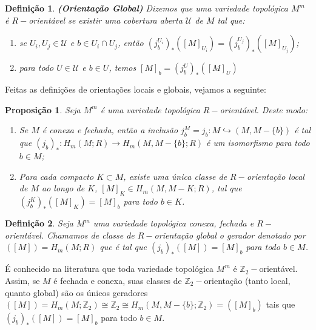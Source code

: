 \documentclass[12pt,oneside]{book} %
\newtheorem{defi}   {\hspace{0.5cm}Defini\c c\~ao}[chapter]
\newtheorem{prop}   {\hspace{0.5cm}Proposi\c c\~ao}[chapter]
\newcommand{\Z}{\mathbb{Z}}
\begin{document}
\begin{defi}{\bf (Orientação Global)}
	Dizemos que uma variedade topológica $M^{m}$ é $R-$orientável se existir uma cobertura aberta $\mathcal{U}$ de $M$ tal que:
	\begin{enumerate}
		\item se $U_{i},U_{j}\in\mathcal{U}$ e $b\in U_{i}\cap U_{j}$, então $(j_{b}^{U_{i}})_{*}([M]_{U_{i}})=(j_{b}^{U_{j}})_{*}([M]_{U_{j}})$;
		\item para todo $U\in\mathcal{U}$ e $b\in U$, temos $[M]_{b}=(j_{b}^{U})_{*}([M]_{U})$
	\end{enumerate}
\end{defi}

\par Feitas as definições de orientações locais e globais, vejamos a seguinte:

\begin{prop}\label{orient_local}
	Seja $M^{m}$ é uma variedade topológica $R-$orientável. Deste modo:
	\begin{enumerate}
		\item Se $M$ é conexa e fechada, então a inclusão $j_{b}^{M}=j_{b}:M\hookrightarrow (M,M-\{b\})$ é tal que $(j_{b})_{*}:H_{m}(M;R)\to H_{m}(M,M-\{b\};R)$ é um isomorfismo para todo $b\in M$;
		\item Para cada compacto $K\subset M$, existe uma única classe de $R-$orientação local de $M$ ao longo de $K$, $[M]_{K}\in H_{m}(M,M-K;R)$, tal que $(j_{b}^{K})_{*}([M]_{K})=[M]_{b}$ para todo $b\in K$.
	\end{enumerate}
\end{prop}

\begin{defi}
	Seja $M^{m}$ uma variedade topológica conexa, fechada e $R-$orientável. Chamamos de classe de $R-$orientação global o gerador denotado por $([M])=H_{m}(M;R)$ que é tal que $(j_{b})_{*}([M])=[M]_{b}$ para todo $b\in M$.
\end{defi}

\par É conhecido na literatura que toda variedade topológica $M^{m}$ é $\Z_{2}-$orientável. Assim, se $M$ é fechada e conexa, suas classes de $\Z_{2}-$orientação (tanto local, quanto global) são os únicos geradores $([M])=H_{m}(M;\Z_{2})\cong\Z_{2}\cong H_{m}(M,M-\{b\};\Z_{2})=([M]_{b})$ tais que $(j_{b})_{*}([M])=[M]_{b}$ para todo $b\in M$.
\end{document}
